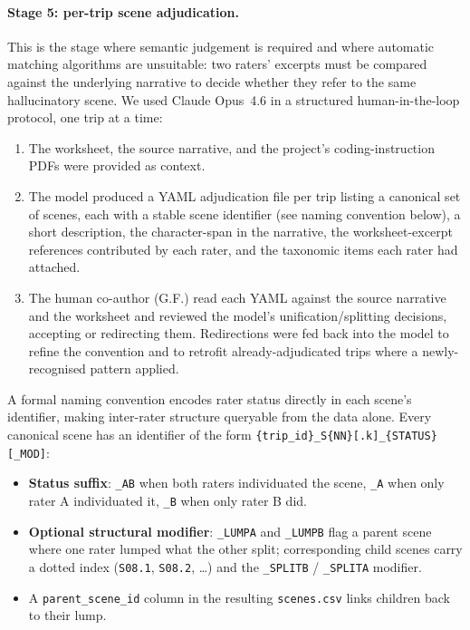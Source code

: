 \paragraph{Stage 5: per-trip scene adjudication.} This is the stage where semantic judgement is required and where automatic matching algorithms are unsuitable: two raters' excerpts must be compared against the underlying narrative to decide whether they refer to the same hallucinatory scene. We used Claude Opus~4.6 in a structured human-in-the-loop protocol, one trip at a time:

\begin{enumerate}[itemsep=2pt]
\item The worksheet, the source narrative, and the project's coding-instruction PDFs were provided as context.
\item The model produced a YAML adjudication file per trip listing a canonical set of scenes, each with a stable scene identifier (see naming convention below), a short description, the character-span in the narrative, the worksheet-excerpt references contributed by each rater, and the taxonomic items each rater had attached.
\item The human co-author (G.F.) read each YAML against the source narrative and the worksheet and reviewed the model's unification/splitting decisions, accepting or redirecting them. Redirections were fed back into the model to refine the convention and to retrofit already-adjudicated trips where a newly-recognised pattern applied.
\end{enumerate}

A formal naming convention encodes rater status directly in each scene's identifier, making inter-rater structure queryable from the data alone. Every canonical scene has an identifier of the form \texttt{\{trip\_id\}\_S\{NN\}[.k]\_\{STATUS\}[\_MOD]}:

\begin{itemize}[itemsep=2pt]
\item \textbf{Status suffix}: \texttt{\_AB} when both raters individuated the scene, \texttt{\_A} when only rater A individuated it, \texttt{\_B} when only rater B did.
\item \textbf{Optional structural modifier}: \texttt{\_LUMPA} and \texttt{\_LUMPB} flag a parent scene where one rater lumped what the other split; corresponding child scenes carry a dotted index (\texttt{S08.1}, \texttt{S08.2}, \ldots) and the \texttt{\_SPLITB} / \texttt{\_SPLITA} modifier.
\item A \texttt{parent\_scene\_id} column in the resulting \texttt{scenes.csv} links children back to their lump.
\end{itemize}

